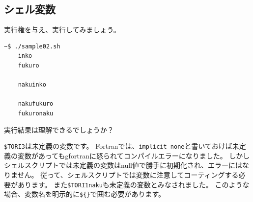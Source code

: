 \documentclass[a4j]{ltjreport}
\begin{document}
    \subsection{シェル変数}


    

    実行権を与え、実行してみましょう。
    \begin{lstlisting}[numbers=none]
    ~$ ./sample02.sh
    inko
    fukuro
    
    nakuinko
    
    nakufukuro
    fukuronaku
    \end{lstlisting}

    実行結果は理解できるでしょうか？

    \texttt{\$TORI3}は未定義の変数です。
    Fortranでは、\texttt{implicit none}と書いておけば未定義の変数があってもgfortranに怒られてコンパイルエラーになりました。
    しかしシェルスクリプトでは未定義の変数はnull値で勝手に初期化され、エラーにはなりません。
    従って、シェルスクリプトでは変数に注意してコーティングする必要があります。
    また\texttt{\$TORI1naku}も未定義の変数とみなされました。
    このような場合、変数名を明示的に\texttt{\$\{\quad\}}で囲む必要があります。


\end{document}
